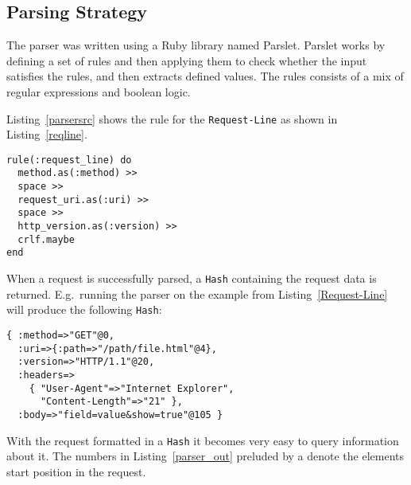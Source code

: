 \subsection{Parsing Strategy}
The parser was written using a Ruby library named Parslet. Parslet works by
defining a set of rules and then applying them to check whether the input
satisfies the rules, and then extracts defined values. The rules consists of a
mix of regular expressions and boolean logic.

Listing~\ref{parsersrc} shows the rule for the \texttt{Request-Line} as shown
in Listing~\ref{reqline}.

\bigskip
\begin{lstlisting}[label=parsersrc]
rule(:request_line) do 
  method.as(:method) >> 
  space >> 
  request_uri.as(:uri) >> 
  space >> 
  http_version.as(:version) >> 
  crlf.maybe 
end
\end{lstlisting}

When a request is successfully parsed, a \texttt{Hash} containing the request
data is returned. E.g.\ running the parser on the example from
Listing~\ref{Request-Line} will produce the following \texttt{Hash}:

\bigskip
\begin{lstlisting}[label=parser_out,caption=Example \texttt{Parser} output]
{ :method=>"GET"@0,
  :uri=>{:path=>"/path/file.html"@4},
  :version=>"HTTP/1.1"@20,
  :headers=>
    { "User-Agent"=>"Internet Explorer",
      "Content-Length"=>"21" },
  :body=>"field=value&show=true"@105 }
\end{lstlisting}

With the request formatted in a \texttt{Hash} it becomes very easy to
query information about it. The numbers in Listing~\ref{parser_out} preluded
by a \@ denote the elements start position in the request.
